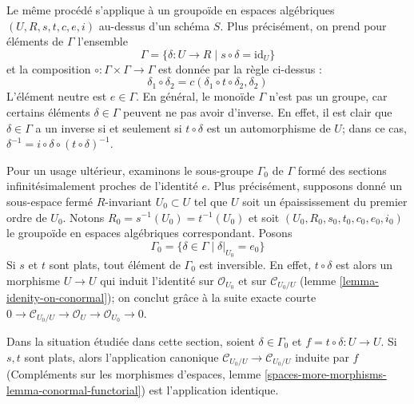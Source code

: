 \medskip\noindent
Le même procédé s'applique à un groupoïde en espaces
algébriques $(U, R, s, t, c, e, i)$ au-dessus d'un schéma $S$.
Plus précisément, on prend pour éléments de $\Gamma$ l'ensemble
$$
\Gamma = \{\delta : U \to R \mid s \circ \delta = \text{id}_U\}
$$
et la composition $\circ : \Gamma \times \Gamma \to \Gamma$
est donnée par la règle ci-dessus :
\begin{equation}
\label{equation-composition}
\delta_1 \circ \delta_2 = c(\delta_1 \circ t \circ \delta_2, \delta_2)
\end{equation}
L'élément neutre est $e \in \Gamma$. En général, le monoïde $\Gamma$ n'est pas
un groupe, car certains éléments $\delta \in \Gamma$ peuvent ne pas
avoir d'inverse. En effet, il est clair que $\delta \in \Gamma$
a un inverse si et seulement si $t \circ \delta$ est un automorphisme
de $U$; dans ce cas,
$\delta^{-1} = i \circ \delta \circ (t \circ \delta)^{-1}$.

\medskip\noindent
Pour un usage ultérieur, examinons le sous-groupe
$\Gamma_0$ de $\Gamma$ formé des sections infinitésimalement
proches de l'identité $e$. Plus précisément, supposons donné un
sous-espace fermé $R$-invariant $U_0 \subset U$ tel que $U$
soit un épaississement du premier ordre de $U_0$. Notons
$R_0 = s^{-1}(U_0) = t^{-1}(U_0)$ et soit
$(U_0, R_0, s_0, t_0, c_0, e_0, i_0)$ le groupoïde
en espaces algébriques correspondant. Posons
$$
\Gamma_0 = \{\delta \in \Gamma \mid \delta|_{U_0} = e_0\}
$$
Si $s$ et $t$ sont plats, tout élément de $\Gamma_0$
est inversible. En effet, $t \circ \delta$ est alors un
morphisme $U \to U$ qui induit l'identité sur
$\mathcal{O}_{U_0}$ et sur $\mathcal{C}_{U_0/U}$
(lemme \ref{lemma-idenity-on-conormal});
on conclut grâce à la suite exacte
courte
$0 \to \mathcal{C}_{U_0/U} \to \mathcal{O}_U \to \mathcal{O}_{U_0} \to 0$.

\begin{lemma}
\label{lemma-idenity-on-conormal}
Dans la situation étudiée dans cette section, soient $\delta \in \Gamma_0$
et $f = t \circ \delta : U \to U$. Si $s, t$ sont plats, alors l'application
canonique $\mathcal{C}_{U_0/U} \to \mathcal{C}_{U_0/U}$ induite par $f$
(Compléments sur les morphismes d'espaces, lemme
\ref{spaces-more-morphisms-lemma-conormal-functorial})
est l'application identique.
\end{lemma}

